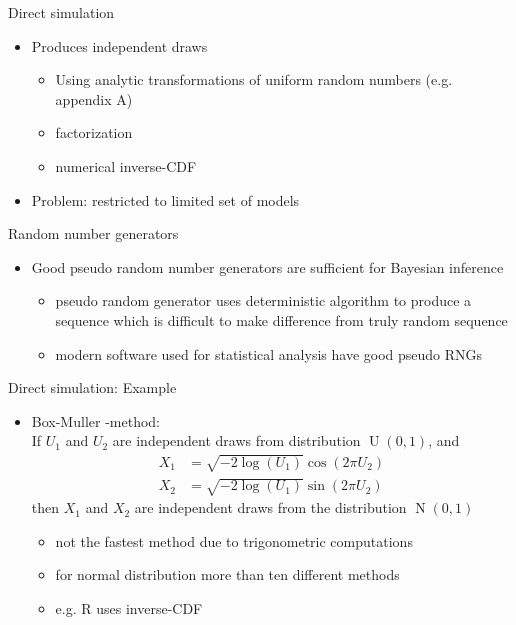 \documentclass[english,t]{beamer}
\DeclareMathOperator{\N}{N}
\DeclareMathOperator{\U}{U}
\begin{document}
\begin{frame}{Direct simulation}

  \begin{itemize}
  \item Produces independent draws
    \begin{itemize}
    \item Using analytic transformations of uniform random numbers
      (e.g. appendix A)
    \item factorization
    \item numerical inverse-CDF
    \end{itemize}
  \item Problem: restricted to limited set of models
  \end{itemize}

\end{frame}

\begin{frame}

  {\Large\color{navyblue} Random number generators}

  \begin{itemize}
  \item Good pseudo random number generators are sufficient for
    Bayesian inference
    \begin{itemize}
    \item pseudo random generator uses deterministic algorithm to
      produce a sequence which is difficult to make difference from
      truly random sequence
    \item modern software used for statistical analysis have good
      pseudo RNGs
    \end{itemize}
  \end{itemize}

\end{frame}

\begin{frame}
{Direct simulation: Example}

  \begin{itemize}
  \item Box-Muller -method:\\ If $U_1$ and $U_2$ are independent
    draws from distribution $\U(0,1)$, and
    \begin{align*}
      X_1 & = \sqrt{-2\log(U_1)}\cos(2\pi U_2) \\
      X_2 & = \sqrt{-2\log(U_1)}\sin(2\pi U_2)
    \end{align*}
    then $X_1$ and $X_2$ are independent draws from the distribution
    $\N(0,1)$
    \pause
    \begin{itemize}
      \item not the fastest method due to trigonometric computations
      \item for normal distribution more than ten different methods
      \item e.g. R uses inverse-CDF
    \end{itemize}
  \end{itemize}

\end{frame}
\end{document}
